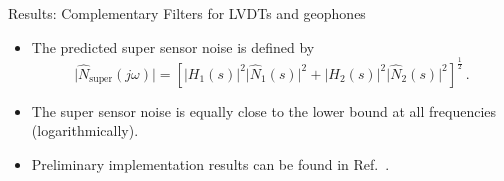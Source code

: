 \documentclass{beamer}
\begin{document}
\begin{frame}[t]
\begin{columns}[t]
\begin{column}{0.32\linewidth}
\begin{block}{Results: Complementary Filters for LVDTs and geophones}
			\medskip
			
			\begin{itemize}
				\item The predicted super sensor noise is defined by
				\begin{equation}
					\lvert \hat{N}_\mathrm{super}(j\omega) \rvert = \left[\lvert H_1(s)\rvert^2 \lvert \hat{N}_1(s) \rvert^2 + \lvert H_2(s)\rvert^2 \lvert \hat{N}_2(s) \rvert^2\right]^{\frac{1}{2}}\,.
				\end{equation}
				\item The super sensor noise is equally close to the lower bound at all frequencies (logarithmically).
				\item Preliminary implementation results can be found in Ref.~\cite{Terrence:SRM}.
			\end{itemize}

%
%			


\end{block}
\end{column}
\end{columns}
\end{frame}
\end{document}
